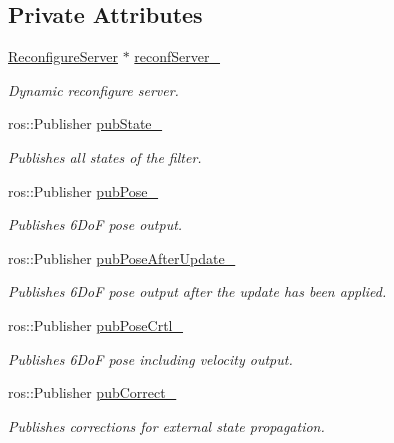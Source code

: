 \subsection*{Private Attributes}
\begin{DoxyCompactItemize}
\item 
\hyperlink{namespacemsf__core_a1f60c4e359e82d9ad14dd135769ccc1a}{Reconfigure\-Server} $\ast$ \hyperlink{structmsf__core_1_1MSF__SensorManagerROS_a87c60917114e5ce7a56d5caf7e5e7a3f}{reconf\-Server\-\_\-}
\begin{DoxyCompactList}\small\item\em Dynamic reconfigure server. \end{DoxyCompactList}\item 
ros\-::\-Publisher \hyperlink{structmsf__core_1_1MSF__SensorManagerROS_a2b01bf34569f618f6f9a31d1c34123f9}{pub\-State\-\_\-}
\begin{DoxyCompactList}\small\item\em Publishes all states of the filter. \end{DoxyCompactList}\item 
ros\-::\-Publisher \hyperlink{structmsf__core_1_1MSF__SensorManagerROS_ad3d00c7d8863b92121fec8444aac5d91}{pub\-Pose\-\_\-}
\begin{DoxyCompactList}\small\item\em Publishes 6\-Do\-F pose output. \end{DoxyCompactList}\item 
ros\-::\-Publisher \hyperlink{structmsf__core_1_1MSF__SensorManagerROS_ac013b12b8951c8e9b1b3fb6ff6bbf289}{pub\-Pose\-After\-Update\-\_\-}
\begin{DoxyCompactList}\small\item\em Publishes 6\-Do\-F pose output after the update has been applied. \end{DoxyCompactList}\item 
ros\-::\-Publisher \hyperlink{structmsf__core_1_1MSF__SensorManagerROS_ac6a25bec7426aaae9111d9d1ae097bdf}{pub\-Pose\-Crtl\-\_\-}
\begin{DoxyCompactList}\small\item\em Publishes 6\-Do\-F pose including velocity output. \end{DoxyCompactList}\item 
ros\-::\-Publisher \hyperlink{structmsf__core_1_1MSF__SensorManagerROS_aae63fa68f54e56e710fa60e19d15824b}{pub\-Correct\-\_\-}
\begin{DoxyCompactList}\small\item\em Publishes corrections for external state propagation. \end{DoxyCompactList}\item 

\end{DoxyCompactItemize}
